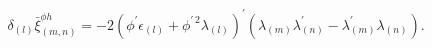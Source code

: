 \begin{equation}
\delta _{(l)}\bar{\xi}_{(m,n)}^{\phi h}=-2(\phi ^{\prime }\epsilon
_{(l)}+\phi ^{\prime \,2}\lambda _{(l)})^{\prime }(\lambda _{(m)}\lambda
_{(n)}^{\prime }-\lambda _{(m)}^{\prime }\lambda _{(n)}).  \label{varxi}
\end{equation}


